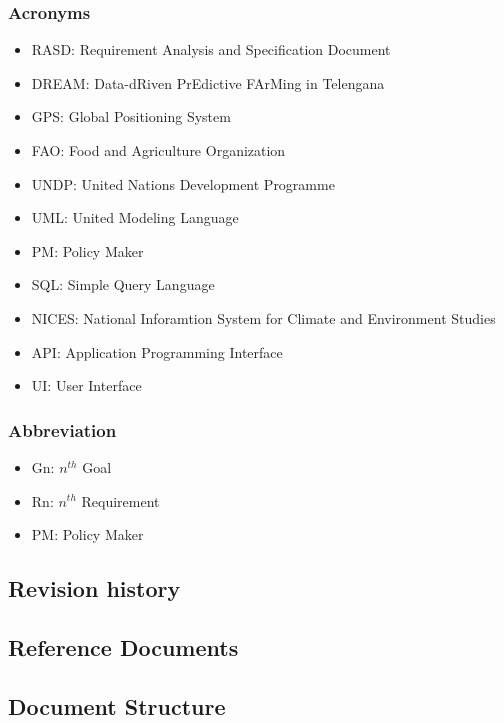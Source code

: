 \subsubsection{Acronyms}
\begin{itemize}
	\item RASD: Requirement Analysis and Specification Document
	\item DREAM: Data-dRiven PrEdictive FArMing in
Telengana
	\item GPS: Global Positioning System
	\item FAO: Food and Agriculture Organization
	\item UNDP: United Nations Development Programme
	\item UML: United Modeling Language
	\item PM: Policy Maker
	\item SQL: Simple Query Language
	\item NICES: National Inforamtion System for Climate and Environment Studies
	\item API: Application Programming Interface
	\item UI: User Interface
\end{itemize}

\subsubsection{Abbreviation}
\begin{itemize}
	\item Gn: $n^{th}$ Goal
	\item Rn: $n^{th}$ Requirement
	\item PM: Policy Maker
\end{itemize}

\subsection{Revision history}

\subsection{Reference Documents}
 




\subsection{Document Structure}
